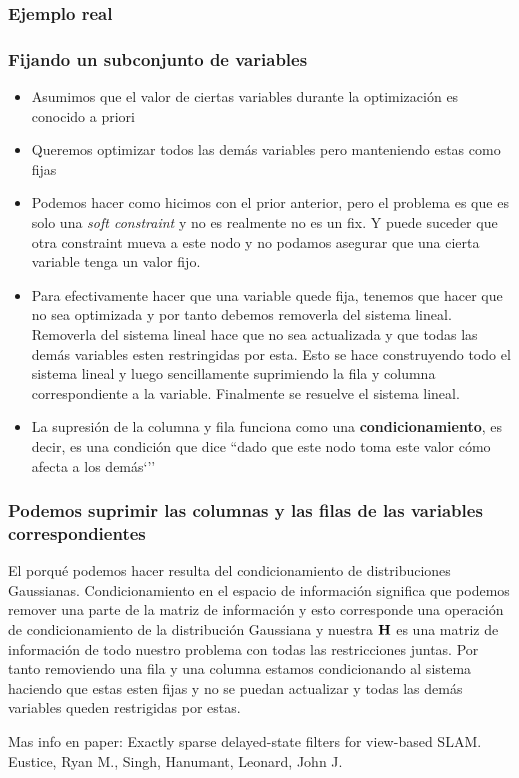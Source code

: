 \begin{frame}
    \frametitle{Ejemplo real}
    
    
\end{frame}

\begin{frame}
    \frametitle{Fijando un subconjunto de variables}
    
    \begin{itemize}
        \item Asumimos que el valor de ciertas variables durante la optimización es conocido a priori
        \item Queremos optimizar todos las demás variables pero manteniendo estas como fijas
        \item Podemos hacer como hicimos con el prior anterior, pero el problema es que es solo una \emph{soft constraint} y no es realmente no es un fix. Y puede suceder que otra constraint mueva a este nodo y no podamos asegurar que una cierta variable tenga un valor fijo.
        \item Para efectivamente hacer que una variable quede fija, tenemos que hacer que no sea optimizada y por tanto debemos removerla del sistema lineal. Removerla del sistema lineal hace que no sea actualizada y que todas las demás variables esten restringidas por esta. Esto se hace construyendo todo el sistema lineal y luego sencillamente suprimiendo la fila y columna correspondiente a la variable. Finalmente se resuelve el sistema lineal.
        \item La supresión de la columna y fila funciona como una {\bf condicionamiento}, es decir, es una condición que dice ``dado que este nodo toma este valor cómo afecta a los demás`''
        
    \end{itemize}
    
\end{frame}

\begin{frame}
    \frametitle{Podemos suprimir las columnas y las filas de las variables correspondientes}
    El porqué podemos hacer resulta del condicionamiento de distribuciones Gaussianas.
    Condicionamiento en el espacio de información significa que podemos remover una parte de la matriz de información y esto corresponde una operación de condicionamiento de la distribución Gaussiana y nuestra $\boldsymbol{\mathbf{H}}$ es una matriz de información de todo nuestro problema con todas las restricciones juntas. Por tanto removiendo una fila y una columna estamos condicionando al sistema haciendo que estas esten fijas y no se puedan actualizar y todas las demás variables queden restrigidas por estas.
    
    Mas info en paper: Exactly sparse delayed-state filters for view-based SLAM. Eustice, Ryan M., Singh, Hanumant, Leonard, John J.
    
\end{frame}

